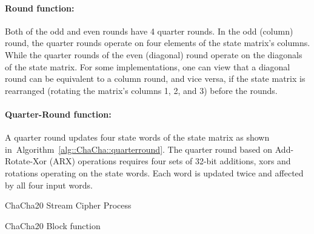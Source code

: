 \paragraph{Round function:} Both of the odd and even rounds have 4 quarter rounds.
In the odd (column) round, the quarter rounds operate on four elements of the state matrix's columns.
While the quarter rounds of the even (diagonal) round operate on the diagonals of the state matrix.
For some implementations, one can view that a diagonal round can be equivalent to a column round, and vice versa, if the state matrix is rearranged (rotating the matrix's columns 1, 2, and 3) before the rounds. 

\paragraph{Quarter-Round function:} A quarter round updates four state words of the state matrix as shown in~Algorithm~\ref{alg::ChaCha::quarterround}. 
The quarter round based on Add-Rotate-Xor (ARX) operations requires four sets of 32-bit additions, xors and  rotations operating on the state words. 
Each word is updated twice and affected by all four input words.

\begin{algorithm}
	\BlankLine
	\caption{ChaCha20 Stream Cipher Process}
	\label{alg::ChaCha::process}
\end{algorithm}

\begin{algorithm}
	\BlankLine
	\caption{ChaCha20 Block function}
	\label{alg::ChaCha::block}
\end{algorithm}

